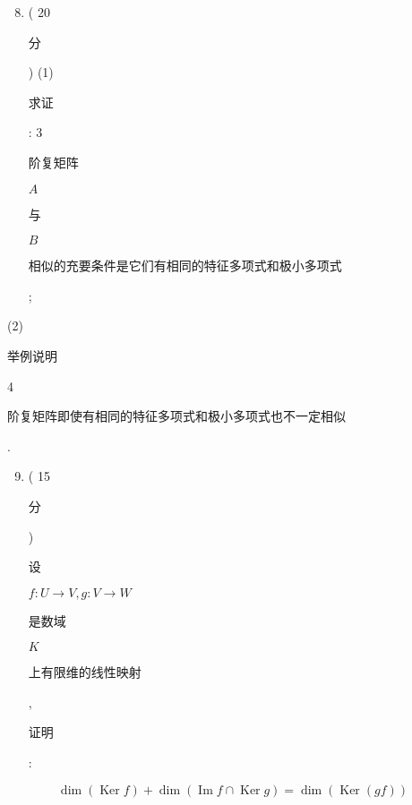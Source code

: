 \documentclass[10pt]{article}
\begin{document}
\begin{enumerate}
  \setcounter{enumi}{7}
  \item ( 20 \begin{CJK}{UTF8}{mj}分\end{CJK}) (1) \begin{CJK}{UTF8}{mj}求证\end{CJK}: 3 \begin{CJK}{UTF8}{mj}阶复矩阵\end{CJK} $A$ \begin{CJK}{UTF8}{mj}与\end{CJK} $B$ \begin{CJK}{UTF8}{mj}相似的充要条件是它们有相同的特征多项式和极小多项式\end{CJK};
\end{enumerate}
(2) \begin{CJK}{UTF8}{mj}举例说明\end{CJK} 4 \begin{CJK}{UTF8}{mj}阶复矩阵即使有相同的特征多项式和极小多项式也不一定相似\end{CJK}.

\begin{enumerate}
  \setcounter{enumi}{8}
  \item ( 15 \begin{CJK}{UTF8}{mj}分\end{CJK}) \begin{CJK}{UTF8}{mj}设\end{CJK} $f: U \rightarrow V, g: V \rightarrow W$ \begin{CJK}{UTF8}{mj}是数域\end{CJK} $K$ \begin{CJK}{UTF8}{mj}上有限维的线性映射\end{CJK}, \begin{CJK}{UTF8}{mj}证明\end{CJK}:
\end{enumerate}
$$
\operatorname{dim}(\operatorname{Ker} f)+\operatorname{dim}(\operatorname{Im} f \cap \operatorname{Ker} g)=\operatorname{dim}(\operatorname{Ker}(g f))
$$
\end{document}
